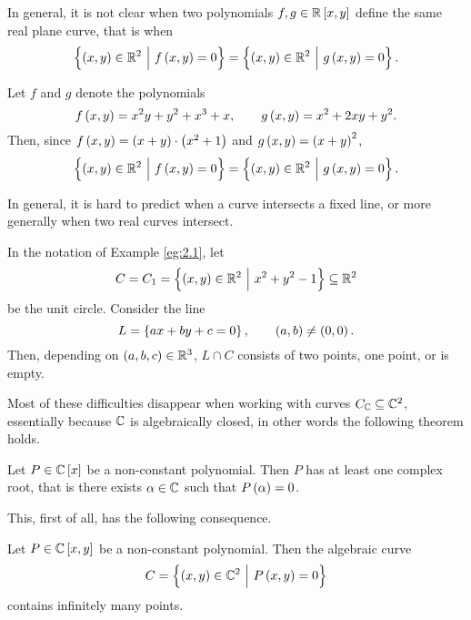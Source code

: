 \begin{fact**}
In general, it is not clear when two polynomials $ f, g \in \RR\sbr{x, y} $ define the same real plane curve, that is when
$$ \cbr{\br{x, y} \in \RR^2 \st f\br{x, y} = 0} = \cbr{\br{x, y} \in \RR^2 \st g\br{x, y} = 0}. $$
\end{fact**}

\begin{example}
\label{eg:2.2}
Let $ f $ and $ g $ denote the polynomials
$$ f\br{x, y} = x^2y + y^2 + x^3 + x, \qquad g\br{x, y} = x^2 + 2xy + y^2. $$
Then, since $ f\br{x, y} = \br{x + y} \cdot \br{x^2 + 1} $ and $ g\br{x, y} = \br{x + y}^2 $,
$$ \cbr{\br{x, y} \in \RR^2 \st f\br{x, y} = 0} = \cbr{\br{x, y} \in \RR^2 \st g\br{x, y} = 0}. $$
\end{example}

\begin{fact**}
In general, it is hard to predict when a curve intersects a fixed line, or more generally when two real curves intersect.
\end{fact**}

\begin{example}
In the notation of Example \ref{eg:2.1}, let
$$ C = C_1 = \cbr{\br{x, y} \in \RR^2 \st x^2 + y^2 - 1} \subseteq \RR^2 $$
be the unit circle. Consider the line
$$ L = \cbr{ax + by + c = 0}, \qquad \br{a, b} \ne \br{0, 0}. $$
Then, depending on $ \br{a, b, c} \in \RR^3 $, $ L \cap C $ consists of two points, one point, or is empty.
\end{example}

Most of these difficulties disappear when working with curves $ C_{\mathbb{C}} \subseteq \mathbb{C}^2 $, essentially because $ \mathbb{C} $ is algebraically closed, in other words the following theorem holds.

\begin{theorem}
\label{thm:2.4}
Let $ P \in \CC\sbr{x} $ be a non-constant polynomial. Then $ P $ has at least one complex root, that is there exists $ \alpha \in \mathbb{C} $ such that $ P\br{\alpha} = 0 $.
\end{theorem}

\pagebreak

This, first of all, has the following consequence.

\begin{proposition}
Let $ P \in \CC\sbr{x, y} $ be a non-constant polynomial. Then the algebraic curve
$$ C = \cbr{\br{x, y} \in \CC^2 \st P\br{x, y} = 0} $$
contains infinitely many points.
\end{proposition}


